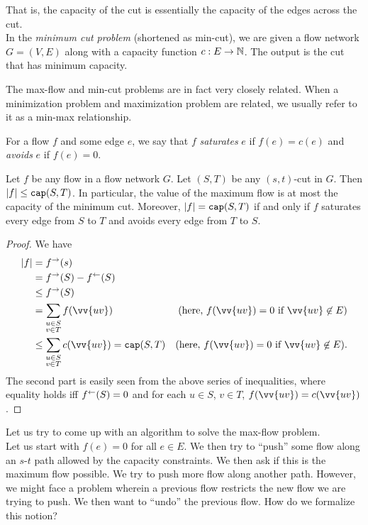 That is, the capacity of the cut is essentially the capacity of the edges across the cut.\\
In the \textit{minimum cut problem} (shortened as min-cut), we are given a flow network $G=(V,E)$ along with a capacity function $c:E\to\mathbb{N}$. The output is the cut that has minimum capacity.

The max-flow and min-cut problems are in fact very closely related. When a minimization problem and maximization problem are related, we usually refer to it as a min-max relationship.

For a flow $f$ and some edge $e$, we say that $f$ \textit{saturates} $e$ if $f(e)=c(e)$ and \textit{avoids} $e$ if $f(e)=0$.

\begin{lemma}
	\label{ff-algo lemma 1}
	Let $f$ be any flow in a flow network $G$. Let $(S,T)$ be any $(s,t)$-cut in $G$. Then $|f|\leq\texttt{cap}(S,T)$. In particular, the value of the maximum flow is at most the capacity of the minimum cut. Moreover, $|f|=\texttt{cap}(S,T)$ if and only if $f$ saturates every edge from $S$ to $T$ and avoids every edge from $T$ to $S$.
\end{lemma}
\begin{proof}
	We have
	\begin{align*}
		|f| &= f^\to(s) \\
			&= f^\to(S) - f^\ot(S) \\
			&\leq f^\to(S) \\
			&= \sum_{\substack{u\in S \\ v\in T}} f(\vv{uv}) & (\text{here, }f(\vv{uv})=0\text{ if }\vv{uv}\not\in E) \\
			&\leq \sum_{\substack{u\in S \\ v\in T}} c(\vv{uv})  = \capp(S,T) & (\text{here, }f(\vv{uv})=0\text{ if }\vv{uv}\not\in E). \\
	\end{align*}
	The second part is easily seen from the above series of inequalities, where equality holds iff $f^\leftarrow(S)=0$ and for each $u\in S$, $v\in T$, $f(\vv{uv})=c(\vv{uv})$.
\end{proof}

Let us try to come up with an algorithm to solve the max-flow problem.\\
Let us start with $f(e)=0$ for all $e\in E$. We then try to ``push'' some flow along an $s$-$t$ path allowed by the capacity constraints. We then ask if this is the maximum flow possible. We try to push more flow along another path. However, we might face a problem wherein a previous flow restricts the new flow we are trying to push. We then want to ``undo'' the previous flow. How do we formalize this notion?

